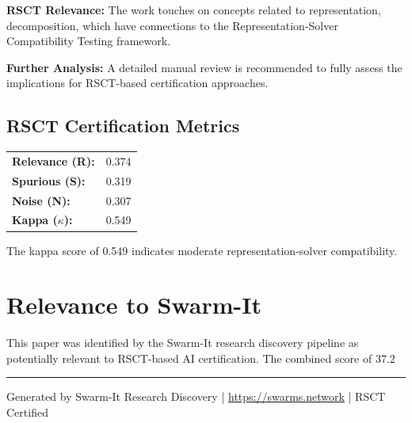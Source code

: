 \documentclass[11pt,a4paper]{article}
\begin{document}
\textbf{RSCT Relevance:} The work touches on concepts related to representation, decomposition, which have connections to the Representation-Solver Compatibility Testing framework.

\textbf{Further Analysis:} A detailed manual review is recommended to fully assess the implications for RSCT-based certification approaches.


\subsection*{RSCT Certification Metrics}
\begin{tabular}{ll}
\textbf{Relevance (R):} & 0.374 \\
\textbf{Spurious (S):} & 0.319 \\
\textbf{Noise (N):} & 0.307 \\
\textbf{Kappa ($\kappa$):} & 0.549 \\
\end{tabular}

The kappa score of 0.549 indicates moderate representation-solver compatibility.


\section{Relevance to Swarm-It}
This paper was identified by the Swarm-It research discovery pipeline as potentially relevant to RSCT-based AI certification. The combined score of 37.2%

\vspace{1em}
\hrule
\vspace{0.5em}
\small{Generated by Swarm-It Research Discovery | \url{https://swarms.network} | RSCT Certified}
\end{document}
